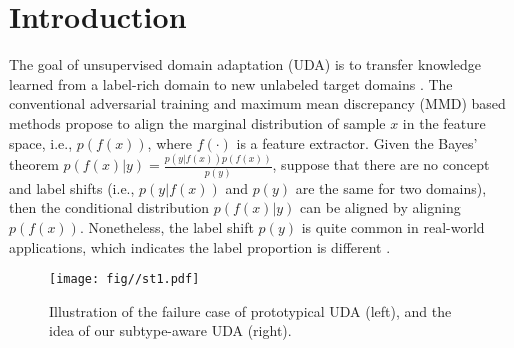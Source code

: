 \section{Introduction}

The goal of unsupervised domain adaptation (UDA) is to transfer knowledge learned from a label-rich domain to new unlabeled target domains \cite{saito2017adversarial,liu2020energy,liu2020disentanglement,zou2019confidence}. The conventional adversarial training and maximum mean discrepancy (MMD) based methods propose to align the marginal distribution of sample $x$ in the feature space, i.e., $p(f(x))$, where $f(\cdot)$ is a feature extractor. Given the Bayes' theorem $p(f(x)|y)=\frac{p(y|f(x))p(f(x))}{p(y)}$, suppose that there are no concept and label shifts (i.e., $p(y|f(x))$ and $p(y)$ are the same for two domains), then the conditional distribution $p(f(x)|y)$ can be aligned by aligning $p(f(x))$. Nonetheless, the label shift $p(y)$ is quite common in real-world applications, which indicates the label proportion is different \cite{zhao2019learning}. 


 
 
\begin{figure}[t]
\centering
\texttt{[image: fig//st1.pdf]}\\
\caption{Illustration of the failure case of prototypical UDA (left), and the idea of our subtype-aware UDA (right).}\label{fig:11} 
\end{figure}









